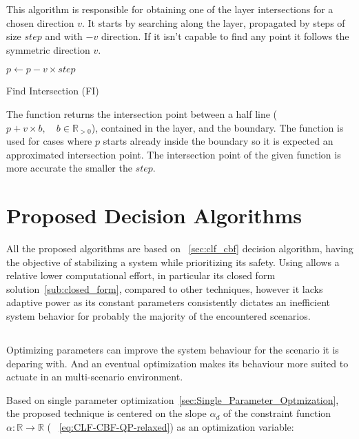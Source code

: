   This algorithm is responsible for obtaining one of the layer intersections for a chosen direction \(v\). It starts by searching along the layer, propagated by steps of size \(step\) and with \(-v\) direction. If it isn't capable to find any point it follows the symmetric direction \(v\).\\

  \begin{algorithm}
    $p \gets p - v \times step$\;
    \caption{Find Intersection (FI)} \label{alg:Find_Intersection}
  \end{algorithm}

 The function returns the intersection point between a half line (\(p + v \times b, \quad b\in \mathbb{R}_{>0}\)), contained in the layer, and the boundary. The function is used for cases where \(p\) starts  already inside the boundary so it is expected an approximated intersection point. The intersection point of the given function is more accurate the smaller the \(step\). \\

\newpage %

\section{Proposed Decision Algorithms}
\label{sec:Proposed_Decision_Algorithms}

All the proposed algorithms are based on ~\ref{sec:clf_cbf} decision algorithm, having the objective of stabilizing a system while prioritizing its safety. Using  allows a relative lower computational effort, in particular its closed form solution~\ref{sub:closed_form}, compared to other techniques, however it lacks adaptive power as its constant parameters consistently dictates an inefficient system behavior for probably the majority of the encountered  scenarios. \\    


\subsection{}
\label{subsec:Just_Optimized_Algorithm}

Optimizing parameters can improve the system behaviour for the scenario it is deparing with. And an eventual optimization makes its behaviour more suited to actuate in an multi-scenario environment. \par
Based on single parameter optimization~\ref{sec:Single_Parameter_Optmization}, the proposed technique is centered on the slope \(\alpha_d\) of the  constraint function \(\alpha:\mathbb{R} \to \mathbb{R}\) ( ~\eqref{eq:CLF-CBF-QP-relaxed}) as an optimization variable:

